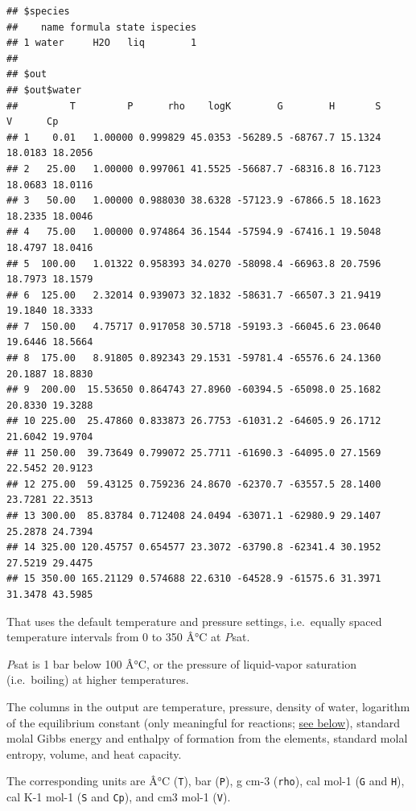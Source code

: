 \documentclass[]{tufte-handout}
\begin{document}
\begin{verbatim}
## $species
##    name formula state ispecies
## 1 water     H2O   liq        1
## 
## $out
## $out$water
##         T         P      rho    logK        G        H       S       V      Cp
## 1    0.01   1.00000 0.999829 45.0353 -56289.5 -68767.7 15.1324 18.0183 18.2056
## 2   25.00   1.00000 0.997061 41.5525 -56687.7 -68316.8 16.7123 18.0683 18.0116
## 3   50.00   1.00000 0.988030 38.6328 -57123.9 -67866.5 18.1623 18.2335 18.0046
## 4   75.00   1.00000 0.974864 36.1544 -57594.9 -67416.1 19.5048 18.4797 18.0416
## 5  100.00   1.01322 0.958393 34.0270 -58098.4 -66963.8 20.7596 18.7973 18.1579
## 6  125.00   2.32014 0.939073 32.1832 -58631.7 -66507.3 21.9419 19.1840 18.3333
## 7  150.00   4.75717 0.917058 30.5718 -59193.3 -66045.6 23.0640 19.6446 18.5664
## 8  175.00   8.91805 0.892343 29.1531 -59781.4 -65576.6 24.1360 20.1887 18.8830
## 9  200.00  15.53650 0.864743 27.8960 -60394.5 -65098.0 25.1682 20.8330 19.3288
## 10 225.00  25.47860 0.833873 26.7753 -61031.2 -64605.9 26.1712 21.6042 19.9704
## 11 250.00  39.73649 0.799072 25.7711 -61690.3 -64095.0 27.1569 22.5452 20.9123
## 12 275.00  59.43125 0.759236 24.8670 -62370.7 -63557.5 28.1400 23.7281 22.3513
## 13 300.00  85.83784 0.712408 24.0494 -63071.1 -62980.9 29.1407 25.2878 24.7394
## 14 325.00 120.45757 0.654577 23.3072 -63790.8 -62341.4 30.1952 27.5219 29.4475
## 15 350.00 165.21129 0.574688 22.6310 -64528.9 -61575.6 31.3971 31.3478 43.5985
\end{verbatim}

That uses the default temperature and pressure settings, i.e.~equally
spaced temperature intervals from 0 to 350 Â°C at \emph{P}sat.

\begin{marginfigure}
\emph{P}sat is 1 bar below 100 Â°C, or the pressure of liquid-vapor
saturation (i.e.~boiling) at higher temperatures.
\end{marginfigure}

The columns in the output are temperature, pressure, density of water,
logarithm of the equilibrium constant (only meaningful for reactions;
\protect\hyperlink{properties-of-reactions}{see below}), standard molal
Gibbs energy and enthalpy of formation from the elements, standard molal
entropy, volume, and heat capacity.

\begin{marginfigure}
The corresponding units are Â°C (\texttt{T}), bar (\texttt{P}), g cm-3
(\texttt{rho}), cal mol-1 (\texttt{G} and \texttt{H}), cal K-1 mol-1
(\texttt{S} and \texttt{Cp}), and cm3 mol-1 (\texttt{V}).
\end{marginfigure}
\end{document}
